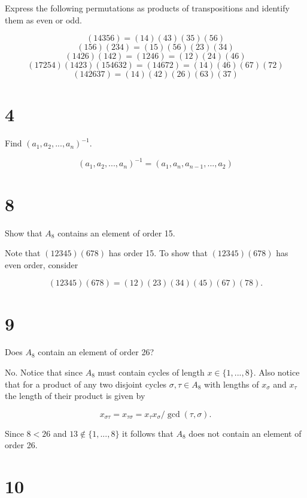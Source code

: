 \documentclass[a4paper]{article}
\begin{document}
Express the following permutations as products of transpositions and identify them as even or odd.

$$(14356) = (14)(43)(35)(56)$$
$$(156)(234) = (15)(56)(23)(34)$$
$$(1426)(142) = (1246) = (12)(24)(46)$$
$$(17254)(1423)(154632) = (14672) = (14)(46)(67)(72)$$
$$(142637) = (14)(42)(26)(63)(37)$$



\section*{4}

Find $(a_1, a_2, ..., a_n)^{-1}$.

$$(a_1, a_2, ..., a_n)^{-1} = (a_1, a_n, a_{n-1}, ..., a_2)$$


\section*{8}

Show that $A_8$ contains an element of order 15.

\vspace{\baselineskip}

Note that $(12345)(678)$ has order 15. To show that $(12345)(678)$ has even order, consider

$$(12345)(678) = (12)(23)(34)(45)(67)(78).$$


\section*{9}

Does $A_8$ contain an element of order 26?

\vspace{\baselineskip}

No. Notice that since $A_8$ must contain cycles of length $x \in \{ 1, ... , 8 \}$. Also notice that for a product of any two disjoint cycles $\sigma, \tau \in A_8$ with lengths of $x_{\sigma}$ and $x_{\tau}$ the length of their product is given by 

$$x_{\sigma \tau} = x_{\tau \sigma} = x_{\tau} x_{\sigma} / \gcd(\tau, \sigma).$$

Since $8 < 26$ and $13 \not \in \{ 1, ... , 8 \}$ it follows that $A_8$ does not contain an element of order 26.



\section*{10}
\end{document}
